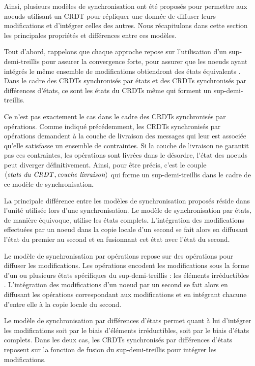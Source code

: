 \label{def:synchro-synthese}

Ainsi, plusieurs modèles de synchronisation ont été proposés pour permettre aux noeuds utilisant un \ac{CRDT} pour répliquer une donnée de diffuser leurs modifications et d'intégrer celles des autres.
Nous récapitulons dans cette section les principales propriétés et différences entre ces modèles.

Tout d'abord, rappelons que chaque approche repose sur l'utilisation d'un sup-demi-treillis pour assurer la convergence forte, \ie pour assurer que les noeuds ayant intégrés le même ensemble de modifications obtiendront des états équivalents .
Dans le cadre des \acp{CRDT} synchronisés par états et des \acp{CRDT} synchronisés par différences d'états, ce sont les états du \acp{CRDT} même qui forment un sup-demi-treillis.

Ce n'est pas exactement le cas dans le cadre des \acp{CRDT} synchronisés par opérations.
Comme indiqué précédemment, les \acp{CRDT} synchronisés par opérations demandent à la couche de livraison des messages qui leur est associée qu'elle satisfasse un ensemble de contraintes.
Si la couche de livraison ne garantit pas ces contraintes, \eg les opérations sont livrées dans le désordre, l'état des noeuds peut diverger définitivement.
Ainsi, pour être précis, c'est le couple $\langle \mathit{etats~du~CRDT},\mathit{couche~livraison} \rangle$ qui forme un sup-demi-treillis dans le cadre de ce modèle de synchronisation.

La principale différence entre les modèles de synchronisation proposés réside dans l'unité utilisée lors d'une synchronisation.
Le modèle de synchronisation par états, de manière équivoque, utilise les états complets.
L'intégration des modifications effectuées par un noeud dans la copie locale d'un second se fait alors en diffusant l'état du premier au second et en fusionnant cet état avec l'état du second.

Le modèle de synchronisation par opérations repose sur des opérations pour diffuser les modifications.
Les opérations encodent les modifications sous la forme  d'un ou plusieurs états spécifiques du sup-demi-treillis : les éléments irréductibles .
L'intégration des modifications d'un noeud par un second se fait alors en diffusant les opérations correspondant aux modifications et en intégrant chacune d'entre elle à la copie locale du second.

Le modèle de synchronisation par différences d'états permet quant à lui d'intégrer les modifications soit par le biais d'éléments irréductibles, soit par le biais d'états complets.
Dans les deux cas, les \acp{CRDT} synchronisés par différences d'états reposent sur la fonction de fusion du sup-demi-treillis pour intégrer les modifications.

